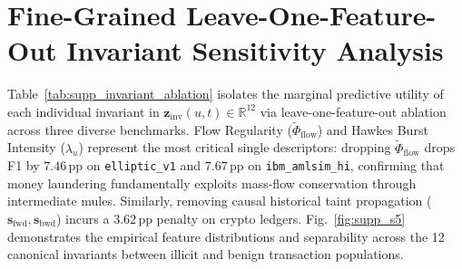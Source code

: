 \documentclass[a4paper,fleqn,twocolumn]{article}
\begin{document}
\section{Fine-Grained Leave-One-Feature-Out Invariant Sensitivity Analysis}
\label{sec:supp_feature_sensitivity}

Table~\ref{tab:supp_invariant_ablation} isolates the marginal predictive utility of each individual invariant in $\mathbf{z}_{\text{inv}}(u, t) \in \mathbb{R}^{12}$ via leave-one-feature-out ablation across three diverse benchmarks. Flow Regularity ($\tilde{\Phi}_{\text{flow}}$) and Hawkes Burst Intensity ($\lambda_u$) represent the most critical single descriptors: dropping $\tilde{\Phi}_{\text{flow}}$ drops F1 by $7.46$\,pp on \texttt{elliptic\_v1} and $7.67$\,pp on \texttt{ibm\_amlsim\_hi}, confirming that money laundering fundamentally exploits mass-flow conservation through intermediate mules. Similarly, removing causal historical taint propagation ($\mathbf{s}_{\text{fwd}}, \mathbf{s}_{\text{bwd}}$) incurs a $3.62$\,pp penalty on crypto ledgers. Fig.~\ref{fig:supp_s5} demonstrates the empirical feature distributions and separability across the 12 canonical invariants between illicit and benign transaction populations.
\end{document}

